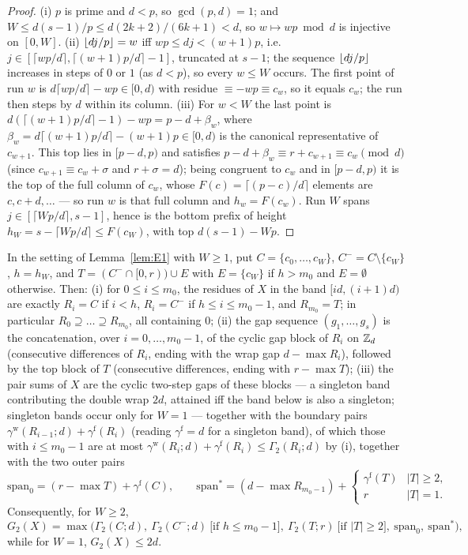 \begin{proof}
(i) $p$ is prime and $d<p$, so $\gcd(p,d)=1$; and
$W\le d(s-1)/p\le d(2k+2)/(6k+1)<d$, so $w\mapsto wp\bmod d$ is
injective on $[0,W]$. (ii) $\left\lfloor dj/p \right\rfloor=w$ iff $wp\le dj<(w+1)p$, i.e.\
$j\in[\lceil wp/d\rceil,\lceil(w+1)p/d\rceil-1]$, truncated at $s-1$;
the sequence $\left\lfloor dj/p \right\rfloor$ increases in steps of $0$ or $1$ (as $d<p$),
so every $w\le W$ occurs. The first point of run $w$ is
$d\lceil wp/d\rceil-wp\in[0,d)$ with residue $\equiv-wp\equiv c_w$, so
it equals $c_w$; the run then steps by $d$ within its column. (iii) For
$w<W$ the last point is
$d(\lceil(w{+}1)p/d\rceil-1)-wp=p-d+\beta_w$, where
$\beta_w=d\lceil(w{+}1)p/d\rceil-(w{+}1)p\in[0,d)$ is the canonical
representative of $c_{w+1}$. This top lies in $[p-d,p)$ and satisfies
$p-d+\beta_w\equiv r+c_{w+1}\equiv c_w\pmod d$ (since
$c_{w+1}\equiv c_w+\sigma$ and $r+\sigma=d$); being congruent to $c_w$
and in $[p-d,p)$ it is the top of the full column of $c_w$, whose
$F(c)=\lceil(p-c)/d\rceil$ elements are $c,c+d,\dots$ --- so run $w$ is
that full column and $h_w=F(c_w)$. Run $W$ spans
$j\in[\lceil Wp/d\rceil,s-1]$, hence is the bottom prefix of height
$h_W=s-\lceil Wp/d\rceil\le F(c_W)$, with top $d(s-1)-Wp$.
\end{proof}

\begin{lemma}\label{lem:E2}
In the setting of Lemma~\ref{lem:E1} with $W\ge1$, put
$C=\{c_0,\dots,c_W\}$, $C^-=C\setminus\{c_W\}$, $h=h_W$, and
$T=(C^-\cap[0,r))\cup E$ with $E=\{c_W\}$ if $h>m_0$ and $E=\emptyset$
otherwise. Then:
\textup{(i)} for $0\le i\le m_0$, the residues of $X$ in the band
$[id,(i{+}1)d)$ are exactly $R_i=C$ if $i<h$, $R_i=C^-$ if
$h\le i\le m_0-1$, and $R_{m_0}=T$; in particular
$R_0\supseteq\dots\supseteq R_{m_0}$, all containing $0$;
\textup{(ii)} the gap sequence $(g_1,\dots,g_s)$ is the concatenation,
over $i=0,\dots,m_0-1$, of the cyclic gap block of $R_i$ on $\mathbb{Z}_d$
(consecutive differences of $R_i$, ending with the wrap gap
$d-\max R_i$), followed by the top block of $T$ (consecutive
differences, ending with $r-\max T$);
\textup{(iii)} the pair sums of $X$ are the cyclic two-step gaps of
these blocks --- a singleton band contributing the double wrap $2d$,
attained iff the band below is also a singleton; singleton bands occur
only for $W=1$ --- together with the boundary pairs
$\gamma^{\mathrm w}(R_{i-1};d)+\gamma^{\mathrm f}(R_i)$ (reading
$\gamma^{\mathrm f}=d$ for a singleton band), of which those with
$i\le m_0-1$ are at most $\gamma^{\mathrm w}(R_i;d)+\gamma^{\mathrm
f}(R_i)\le\Gamma_2(R_i;d)$ by (i), together with the two outer pairs
\[
\mathrm{span}_0=(r-\max T)+\gamma^{\mathrm f}(C),\qquad
\mathrm{span}^\ast=(d-\max R_{m_0-1})+\begin{cases}
\gamma^{\mathrm f}(T)&|T|\ge2,\\ r&|T|=1.\end{cases}
\]
Consequently, for $W\ge2$,
\[
G_2(X)=\max\bigl(\Gamma_2(C;d),\ \Gamma_2(C^-;d)\ \text{[if $h\le
m_0-1$]},\ \Gamma_2(T;r)\ \text{[if $|T|\ge2$]},\
\mathrm{span}_0,\ \mathrm{span}^\ast\bigr),
\]
while for $W=1$, $G_2(X)\le2d$.
\end{lemma}

